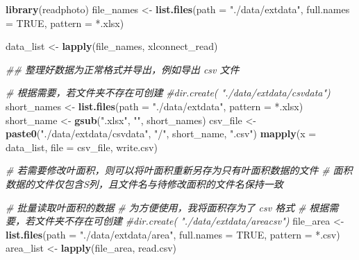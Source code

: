 \documentclass[
]{krantz}
\makeatletter
\newenvironment{Shaded}{\begin{snugshade}}{\end{snugshade}}
\newcommand{\CommentTok}[1]{\textcolor[rgb]{0.56,0.35,0.01}{\textit{#1}}}
\newcommand{\DataTypeTok}[1]{\textcolor[rgb]{0.13,0.29,0.53}{#1}}
\newcommand{\KeywordTok}[1]{\textcolor[rgb]{0.13,0.29,0.53}{\textbf{#1}}}
\newcommand{\NormalTok}[1]{#1}
\newcommand{\OtherTok}[1]{\textcolor[rgb]{0.56,0.35,0.01}{#1}}
\newcommand{\StringTok}[1]{\textcolor[rgb]{0.31,0.60,0.02}{#1}}
\newenvironment{kframe}{%
\medskip{}
\setlength{\fboxsep}{.8em}
 \def\at@end@of@kframe{}%
 \ifinner\ifhmode%
  \def\at@end@of@kframe{\end{minipage}}%
  \begin{minipage}{\columnwidth}%
 \fi\fi%
 \def\FrameCommand##1{\hskip\@totalleftmargin \hskip-\fboxsep
 \colorbox{shadecolor}{##1}\hskip-\fboxsep
     \hskip-\linewidth \hskip-\@totalleftmargin \hskip\columnwidth}%
 \MakeFramed {\advance\hsize-\width
   \@totalleftmargin\z@ \linewidth\hsize
   \@setminipage}}%
 {\par\unskip\endMakeFramed%
 \at@end@of@kframe}
\renewenvironment{Shaded}{\begin{kframe}}{\end{kframe}}
\makeatother
\begin{document}
\begin{Shaded}
\begin{Highlighting}[]
\KeywordTok{library}\NormalTok{(readphoto)}
\NormalTok{file\_names \textless{}{-}}
\StringTok{  }\KeywordTok{list.files}\NormalTok{(}\DataTypeTok{path =} \StringTok{"./data/extdata"}\NormalTok{,}
             \DataTypeTok{full.names =} \OtherTok{TRUE}\NormalTok{,}
             \DataTypeTok{pattern =} \StringTok{\textquotesingle{}*.xlsx\textquotesingle{}}\NormalTok{)}

\NormalTok{data\_list \textless{}{-}}\StringTok{ }\KeywordTok{lapply}\NormalTok{(file\_names, xlconnect\_read)}

\CommentTok{\#\# 整理好数据为正常格式并导出，例如导出 csv 文件}

\CommentTok{\# 根据需要，若文件夹不存在可创建}
\CommentTok{\#dir.create( "./data/extdata/csvdata")}
\NormalTok{short\_names \textless{}{-}}
\StringTok{  }\KeywordTok{list.files}\NormalTok{(}\DataTypeTok{path =} \StringTok{"./data/extdata"}\NormalTok{, }\DataTypeTok{pattern =} \StringTok{\textquotesingle{}*.xlsx\textquotesingle{}}\NormalTok{)}
\NormalTok{short\_name \textless{}{-}}\StringTok{ }\KeywordTok{gsub}\NormalTok{(}\StringTok{".xlsx"}\NormalTok{, }\StringTok{""}\NormalTok{, short\_names)}
\NormalTok{csv\_file \textless{}{-}}
\StringTok{  }\KeywordTok{paste0}\NormalTok{(}\StringTok{"./data/extdata/csvdata"}\NormalTok{, }\StringTok{"/"}\NormalTok{, short\_name, }\StringTok{".csv"}\NormalTok{)}
\KeywordTok{mapply}\NormalTok{(}\DataTypeTok{x =}\NormalTok{ data\_list, }\DataTypeTok{file =}\NormalTok{ csv\_file, write.csv)}



\CommentTok{\# 若需要修改叶面积，则可以将叶面积重新另存为只有叶面积数据的文件}
\CommentTok{\# 面积数据的文件仅包含S列，且文件名与待修改面积的文件名保持一致}


\CommentTok{\# 批量读取叶面积的数据}
\CommentTok{\# 为方便使用，我将面积存为了 csv 格式}
\CommentTok{\# 根据需要，若文件夹不存在可创建}
\CommentTok{\#dir.create( "./data/extdata/areacsv")}
\NormalTok{file\_area \textless{}{-}}
\StringTok{  }\KeywordTok{list.files}\NormalTok{(}\DataTypeTok{path =} \StringTok{"./data/extdata/area"}\NormalTok{,}
             \DataTypeTok{full.names =} \OtherTok{TRUE}\NormalTok{,}
             \DataTypeTok{pattern =} \StringTok{\textquotesingle{}*.csv\textquotesingle{}}\NormalTok{)}
\NormalTok{area\_list \textless{}{-}}\StringTok{ }\KeywordTok{lapply}\NormalTok{(file\_area, read.csv)}


\end{Highlighting}
\end{Shaded}
\end{document}
